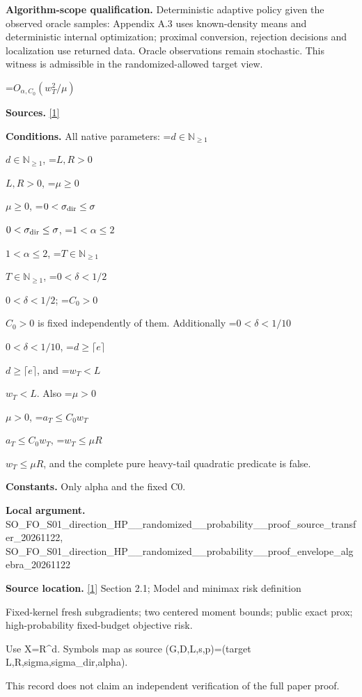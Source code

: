 \documentclass[10pt,a4paper]{article}
\newcommand{\AtlasMath}[1]{\par\begingroup\centering\setbox0=\hbox{$\displaystyle #1$}\ifdim\wd0>1.4\linewidth\typeout{ATLAS WIDE FORMULA: \the\wd0}\fi\ifdim\wd0>\linewidth\resizebox{\linewidth}{!}{\box0}\else\box0\fi\par\endgroup}
\newcommand{\AtlasInlineMath}[1]{\begingroup\setbox0=\hbox{$#1$}\ifdim\wd0>.4\linewidth\endgroup\AtlasMath{#1}\else\endgroup$#1$\fi}
\begin{document}
\textbf{Algorithm-scope qualification.} Deterministic adaptive policy given the observed oracle samples: Appendix A.3 uses known-density means and deterministic internal optimization; proximal conversion, rejection decisions and localization use returned data. Oracle observations remain stochastic. This witness is admissible in the randomized-allowed target view.



\AtlasMath{O_{\alpha,C_0}\!\left(w_T^2/\mu\right)}


\textbf{Sources.} \href{https://arxiv.org/html/2610.00260v2}{[1]}



\textbf{Conditions.} All native parameters: \AtlasInlineMath{d\in\mathbb N_{\ge1}}, \AtlasInlineMath{L,R>0}, \AtlasInlineMath{\mu\ge0}, \AtlasInlineMath{0<\sigma_{\rm dir}\le\sigma}, \AtlasInlineMath{1<\alpha\le2}, \AtlasInlineMath{T\in\mathbb N_{\ge1}}, \AtlasInlineMath{0<\delta<1/2}; \AtlasInlineMath{C_0>0} is fixed independently of them. Additionally \AtlasInlineMath{0<\delta<1/10}, \AtlasInlineMath{d\ge\lceil e\rceil}, and \AtlasInlineMath{w_T<L}. Also \AtlasInlineMath{\mu>0}, \AtlasInlineMath{a_T\le C_0w_T}, \AtlasInlineMath{w_T\le\mu R}, and the complete pure heavy-tail quadratic predicate is false.



\textbf{Constants.} Only alpha and the fixed C0.



\textbf{Local argument.} SO\_FO\_S01\_direction\_HP\_\_\allowbreak{}randomized\_\_probability\_\allowbreak{}\_proof\_source\_transfer\_2\allowbreak{}0261122, SO\_FO\_S01\_direction\_HP\_\_\allowbreak{}randomized\_\_probability\_\allowbreak{}\_proof\_envelope\_algebra\_\allowbreak{}20261122



\textbf{Source location.} \href{https://arxiv.org/html/2610.00260v2}{[1]} Section 2.1; Model and minimax risk definition



Fixed-kernel fresh subgradients; two centered moment bounds; public exact prox; high-probability fixed-budget objective risk.



Use X=R\textasciicircum{}d. Symbols map as source (G,D,L,s,p)=(target L,R,sigma,sigma\_dir,alpha).



This record does not claim an independent verification of the full paper proof.
\end{document}
